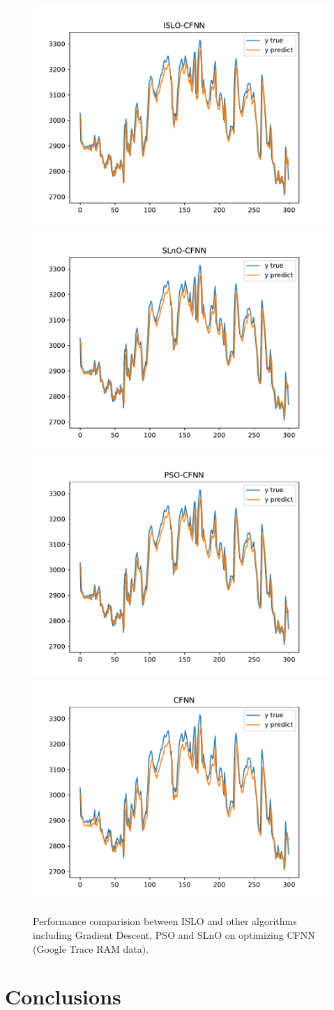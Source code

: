 \documentclass[a4paper,13pt,2p]{report}
\begin{document}
\begin{figure}[!ht] 
   \centering
   	\includegraphics[width=0.49\linewidth]{pdf/result_data/ram/ISLO_CFNN_ram}
  	 \includegraphics[width=0.49\linewidth]{pdf/result_data/ram/SLnO_CFNN_ram}
  	 \includegraphics[width=0.49\linewidth]{pdf/result_data/ram/PSO_CFNN_ram}
  	 \includegraphics[width=0.49\linewidth]{pdf/result_data/ram/CFNN-1H_ram}
	
  \caption{Performance comparision between ISLO and other algorithms including Gradient Descent, PSO and SLnO on optimizing CFNN (Google Trace RAM data).} 
  \label{fig_result_cpu_islo_rnn} 
\end{figure}

\chapter{Conclusions}

\appendix



%
%
\end{document}
